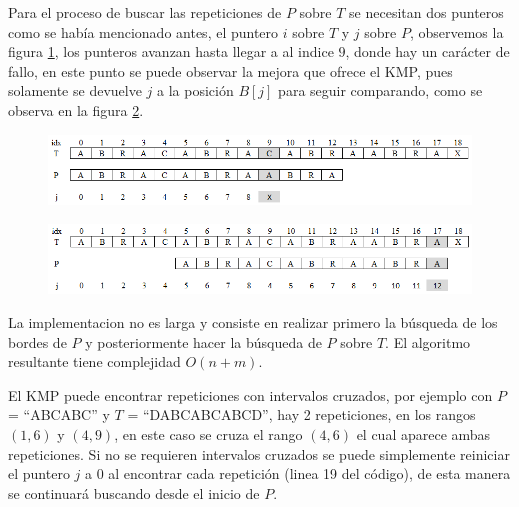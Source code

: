 \documentclass[12pt, a4paper]{article}
\newcommand\cppfile[2][]{

}
\newcommand{\quotes}[1]{``#1''}
\begin{document}
	Para el proceso de buscar las repeticiones de $P$ sobre $T$ se necesitan dos punteros como se había mencionado 
	antes, el puntero $i$ sobre $T$ y $j$ sobre $P$, observemos la figura \ref{strings:KMP:match1}, los punteros 
	avanzan hasta llegar a al indice $9$, donde hay un carácter de fallo, en este punto se puede observar la mejora
	que ofrece el KMP, pues solamente se devuelve $j$ a la posición $B[j]$ para seguir comparando, como se observa
	en la figura \ref{strings:KMP:match2}.\\
	
	\begin{figure}[!htb]
		\centering
		\includegraphics[scale=0.75]{strings/imagenes/KMP/match1}
		\caption{}
		\label{strings:KMP:match1}
	\end{figure}
	
	\begin{figure}[!htb]
		\centering
		\includegraphics[scale=0.75]{strings/imagenes/KMP/match2}
		\caption{}
		\label{strings:KMP:match2}
	\end{figure}
	
	La implementacion no es larga y consiste en realizar primero la búsqueda de los bordes de $P$ y posteriormente 
	hacer la búsqueda de $P$ sobre $T$. El algoritmo resultante tiene complejidad $O(n+m)$.
	
	\cppfile[7-28]{strings/codigos/KMP.cpp}
	
	El KMP puede encontrar repeticiones con intervalos cruzados, por ejemplo con $P$ = \quotes{ABCABC} y 
	$T$ = \quotes{DABCABCABCD}, hay 2 repeticiones, en los rangos $(1,6)$ y $(4,9)$, en este caso se cruza el rango 
	$(4,6)$ el cual aparece ambas repeticiones. Si no se requieren intervalos cruzados se puede simplemente reiniciar
	el puntero $j$ a $0$ al encontrar cada repetición (linea 19 del código), de esta manera se continuará buscando 
	desde el inicio de $P$.
	
	
	
\end{document}
